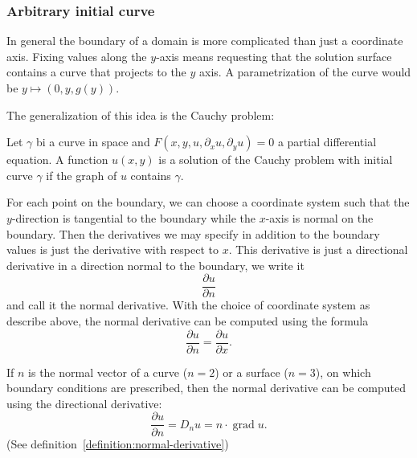 \subsubsection{Arbitrary initial curve}
In general the boundary of a domain is more complicated than just 
a coordinate axis.
Fixing values along the $y$-axis means requesting that the solution
surface contains a curve that projects to the $y$ axis.
A parametrization of the curve would be $y\mapsto (0,y,g(y))$.

The generalization of this idea is the Cauchy problem:

\begin{problem}
Let $\gamma$ bi a curve in space and 
$F(x,y,u,\partial_xu,\partial_yu)=0$ a partial differential equation.
A function $u(x,y)$ is a solution of the Cauchy problem with initial
curve $\gamma$ if the graph of $u$ contains $\gamma$.
\end{problem}

For each point on the boundary, we can choose a coordinate system such
that the $y$-direction is tangential to the boundary while the $x$-axis
is normal on the boundary.
Then the derivatives we may specify in addition to the boundary
values is just the derivative with respect to $x$.
This derivative is just a directional derivative in a direction normal
to the boundary, we write it
\[
\frac{\partial u}{\partial n}
\]
and call it the normal derivative.
With the choice of coordinate system as describe above, the normal
derivative can be computed using the formula
\[
\frac{\partial u}{\partial n}
=\frac{\partial u}{\partial x}.
\]

If $n$ is the normal vector of a curve ($n=2$) or a surface ($n=3$),
on which boundary conditions are prescribed, then the normal derivative
can be computed using the directional derivative:
\[
\frac{\partial u}{\partial n}=D_nu = n\cdot \operatorname{grad} u.
\]
(See definition~\ref{definition:normal-derivative})

